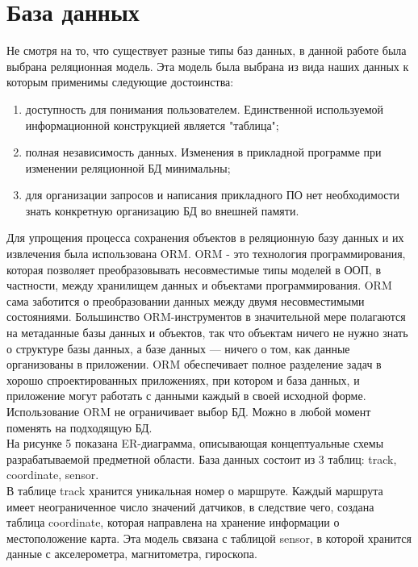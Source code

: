 \documentclass[a4paper, 10pt]{article}
\begin{document}
	\section{База данных}
	\hspace*{5mm} Не смотря на то, что существует разные типы баз данных, в данной работе была выбрана реляционная модель. Эта модель была выбрана из вида наших данных к которым применимы следующие достоинства:
	\begin{enumerate}
		\item доступность для понимания пользователем. Единственной используемой информационной конструкцией является "таблица";
		\item полная независимость данных. Изменения в прикладной программе при изменении реляционной БД минимальны;
		\item для организации запросов и написания прикладного ПО нет необходимости знать конкретную организацию БД во внешней памяти. 
	\end{enumerate}
	\hspace*{5mm} Для упрощения процесса сохранения объектов в реляционную базу данных и их извлечения была использована ORM. ORM - это технология программирования, которая позволяет преобразовывать несовместимые типы моделей в ООП, в частности, между хранилищем данных и объектами программирования. ORM сама заботится о преобразовании данных между двумя несовместимыми состояниями. Большинство ORM-инструментов в значительной мере полагаются на метаданные базы данных и объектов, так что объектам ничего не нужно знать о структуре базы данных, а базе данных — ничего о том, как данные организованы в приложении. ORM обеспечивает полное разделение задач в хорошо спроектированных приложениях, при котором и база данных, и приложение могут работать с данными каждый в своей исходной форме. Использование ORM не ограничивает выбор БД. Можно в любой момент поменять на подходящую БД.
	\\ \hspace*{5mm} На рисунке 5 показана ER-диаграмма, описывающая концептуальные схемы разрабатываемой предметной области. База данных состоит из 3 таблиц: track, coordinate, sensor.
	\\ \hspace*{5mm} В таблице track хранится уникальная номер о маршруте. Каждый маршрута имеет неограниченное число значений датчиков, в следствие чего, создана таблица coordinate, которая направлена на хранение информации о местоположение карта. Эта модель связана с таблицой sensor, в которой хранится данные с акселерометра, магнитометра, гироскопа.
\end{document}
